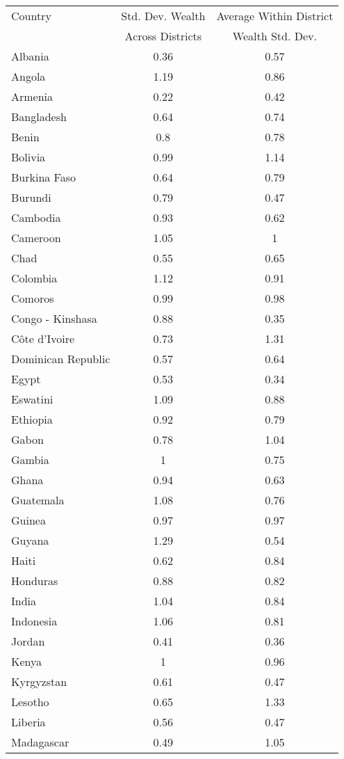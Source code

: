 \begin{tabular}{lcc} 
\hline 
Country & Std. Dev. Wealth & Average Within District \\ 
         & Across Districts & Wealth Std. Dev. \\ 
 \hline 
Albania & 0.36 & 0.57 \\ 
 Angola & 1.19 & 0.86 \\ 
 Armenia & 0.22 & 0.42 \\ 
 Bangladesh & 0.64 & 0.74 \\ 
 Benin & 0.8 & 0.78 \\ 
 Bolivia & 0.99 & 1.14 \\ 
 Burkina Faso & 0.64 & 0.79 \\ 
 Burundi & 0.79 & 0.47 \\ 
 Cambodia & 0.93 & 0.62 \\ 
 Cameroon & 1.05 & 1 \\ 
 Chad & 0.55 & 0.65 \\ 
 Colombia & 1.12 & 0.91 \\ 
 Comoros & 0.99 & 0.98 \\ 
 Congo - Kinshasa & 0.88 & 0.35 \\ 
 Côte d’Ivoire & 0.73 & 1.31 \\ 
 Dominican Republic & 0.57 & 0.64 \\ 
 Egypt & 0.53 & 0.34 \\ 
 Eswatini & 1.09 & 0.88 \\ 
 Ethiopia & 0.92 & 0.79 \\ 
 Gabon & 0.78 & 1.04 \\ 
 Gambia & 1 & 0.75 \\ 
 Ghana & 0.94 & 0.63 \\ 
 Guatemala & 1.08 & 0.76 \\ 
 Guinea & 0.97 & 0.97 \\ 
 Guyana & 1.29 & 0.54 \\ 
 Haiti & 0.62 & 0.84 \\ 
 Honduras & 0.88 & 0.82 \\ 
 India & 1.04 & 0.84 \\ 
 Indonesia & 1.06 & 0.81 \\ 
 Jordan & 0.41 & 0.36 \\ 
 Kenya & 1 & 0.96 \\ 
 Kyrgyzstan & 0.61 & 0.47 \\ 
 Lesotho & 0.65 & 1.33 \\ 
 Liberia & 0.56 & 0.47 \\ 
 Madagascar & 0.49 & 1.05 \\ 

\end{tabular}
